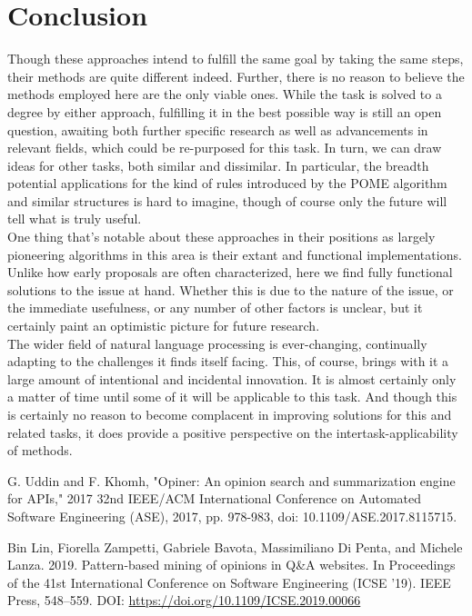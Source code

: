 \documentclass[a4paper,10pt, bibliography=totocnumbered]{scrreprt}
\begin{document}
\chapter{Conclusion}

Though these approaches intend to fulfill the same goal by taking the same steps, their methods are quite different indeed. Further, there is no reason to believe the methods employed here are the only viable ones. While the task is solved to a degree by either approach, fulfilling it in the best possible way is still an open question, awaiting both further specific research as well as advancements in relevant fields, which could be re-purposed for this task. In turn, we can draw ideas for other tasks, both similar and dissimilar. In particular, the breadth potential applications for the kind of rules introduced by the POME algorithm and similar structures is hard to imagine, though of course only the future will tell what is truly useful. \\
One thing that's notable about these approaches in their positions as largely pioneering algorithms in this area is their extant and functional implementations. Unlike how early proposals are often characterized, here we find fully functional solutions to the issue at hand. Whether this is due to the nature of the issue, or the immediate usefulness, or any number of other factors is unclear, but it certainly paint an optimistic picture for future research.\\
The wider field of natural language processing is ever-changing, continually adapting to the challenges it finds itself facing. This, of course, brings with it a large amount of intentional and incidental innovation. It is almost certainly only a matter of time until some of it will be applicable to this task. And though this is certainly no reason to become complacent in improving solutions for this and related tasks, it does provide a positive perspective on the intertask-applicability of methods.



\begin{thebibliography}{9}

 G. Uddin and F. Khomh, "Opiner: An opinion search and summarization engine for APIs," 2017 32nd IEEE/ACM International Conference on Automated Software Engineering (ASE), 2017, pp. 978-983, doi: 10.1109/ASE.2017.8115715.

 Bin Lin, Fiorella Zampetti, Gabriele Bavota, Massimiliano Di Penta, and Michele Lanza. 2019. Pattern-based mining of opinions in Q\&A websites. In Proceedings of the 41st International Conference on Software Engineering (ICSE '19). IEEE Press, 548–559. DOI:
\url{https://doi.org/10.1109/ICSE.2019.00066}

\end{thebibliography}

\listoffigures

\end{document}
